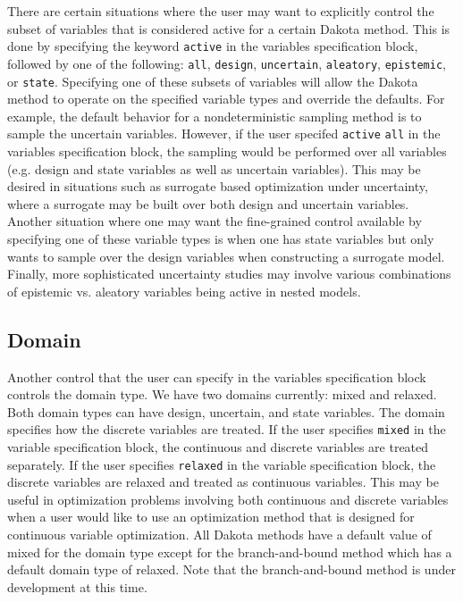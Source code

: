 There are certain situations where the user may want to explicitly 
control the subset of variables that is considered active for a 
certain Dakota method.  This is done by specifying the keyword 
\texttt{active} in the variables specification block, followed by 
one of the following:  \texttt{all}, \texttt{design}, \texttt{uncertain},
\texttt{aleatory}, \texttt{epistemic}, or \texttt{state}.  
Specifying one of these subsets of variables will allow the 
Dakota method to operate on the specified variable types and override 
the defaults.  For example, the default behavior for a 
nondeterministic sampling method is to sample the uncertain 
variables.  However, if the user specifed \texttt{active}  \texttt{all} 
in the variables specification block, the sampling would be performed 
over all variables (e.g. design and state variables as well as 
uncertain variables).  This may be desired in situations such as 
surrogate based optimization under uncertainty, where a surrogate may 
be built over both design and uncertain variables.  
Another situation where one may want the fine-grained control 
available by specifying one of these variable types is when one 
has state variables but only wants to sample over the design 
variables when constructing a surrogate model.  Finally, 
more sophisticated uncertainty studies may involve various 
combinations of epistemic vs. aleatory variables being active 
in nested models.

\subsection{Domain}\label{variables:domain}
Another control that the user can specify in the variables specification 
block controls the domain type.  We have two domains currently:  
mixed and relaxed.  Both domain types can have design, uncertain, 
and state variables.  The domain specifies how the discrete variables 
are treated. If the user 
specifies \texttt{mixed} in the variable specification block, 
the continuous and discrete variables are treated separately. 
If the user specifies \texttt{relaxed} in the variable specification block, 
the discrete variables are relaxed and treated as continuous variables. 
This may be useful in optimization problems involving both 
continuous and discrete variables when a user would like 
to use an optimization method that is designed for continuous variable 
optimization.  All Dakota methods have a default value of mixed for the 
domain type except for the branch-and-bound method which has a default 
domain type of relaxed.  Note that the branch-and-bound method is 
under development at this time. 

